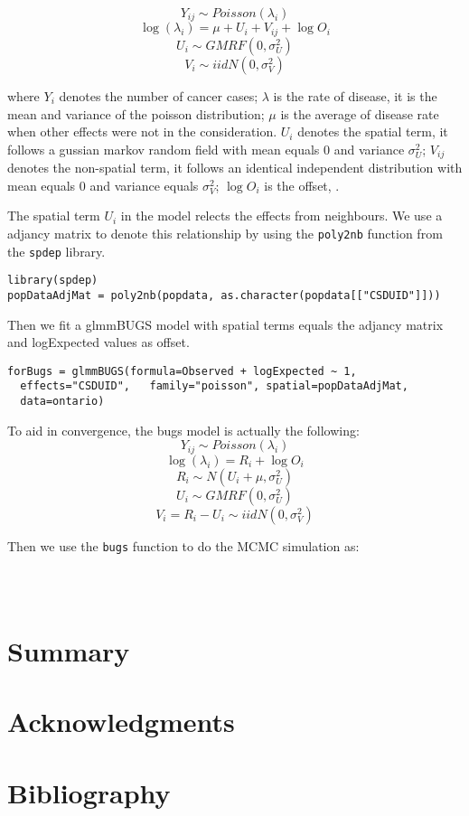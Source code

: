 \documentclass{article}
\begin{document}
\[Y_{ij} \sim  Poisson(\lambda_i)\]
\[\log(\lambda_i) = \mu + U_i + V_{ij}+ \log{O_i}\]
\[U_i \sim GMRF(0, \sigma_U^2)\]
\[V_i \sim iid N(0, \sigma_V^2)\] 

where $Y_i$ denotes the number of cancer cases;  $\lambda$ is the rate of disease, it is the mean and variance of the poisson distribution; $\mu$ is the average of disease rate when other effects were not in the consideration.
$U_i$ denotes the spatial term, it follows a gussian markov random field with mean equals $0$ and variance $\sigma_U^2$; $V_{ij}$ denotes the non-spatial term, it follows an identical independent distribution with mean equals $0$ and variance equals $\sigma_V^2$; $\log{O_i}$ is the offset, .

The spatial term $U_i$ in the model relects the effects from neighbours. We use a adjancy matrix to denote this relationship by using the \verb!poly2nb! function from the \verb!spdep! library. 

\begin{verbatim}
library(spdep)
popDataAdjMat = poly2nb(popdata, as.character(popdata[["CSDUID"]]))
\end{verbatim}

Then we fit a glmmBUGS model with spatial terms equals the adjancy matrix and logExpected values as offset.
\begin{verbatim}
forBugs = glmmBUGS(formula=Observed + logExpected ~ 1,
  effects="CSDUID",   family="poisson", spatial=popDataAdjMat,
  data=ontario)
\end{verbatim}

To aid in convergence, the bugs model is actually the following:
\[Y_{ij} \sim  Poisson(\lambda_i)\]
\[\log(\lambda_i) = R_i+ \log{O_i}\]
\[R_i \sim N(U_i + \mu, \sigma_U^2)\]
\[U_i \sim GMRF(0, \sigma_U^2)\]
\[V_{i} = R_i - U_i \sim iid N(0, \sigma_V^2)\] 

Then we use the \verb!bugs! function to do the MCMC simulation as: 

\begin{verbatim}



\end{verbatim}


\section{Summary}

\section{Acknowledgments}


\section{Bibliography}
\end{document}

